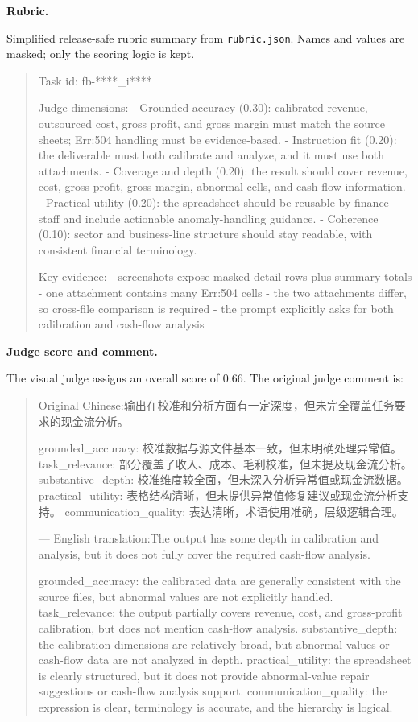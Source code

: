 \documentclass[11pt, a4paper, copyright, frontis]{frontis}
\newcommand{\inlinett}[1]{{\footnotesize\texttt{#1}}}
\newcommand{\caseheader}[1]{\noindent\colorbox{fbcaseblue}{\parbox{0.96\linewidth}{\color{white}\bfseries #1}}\vspace{0.5mm}\newline}
\newenvironment{casebox}{%
  \begin{quote}%
  \setlength{\parindent}{0pt}%
  \setlength{\parskip}{0pt}%
}{%
  \end{quote}%
}
\newenvironment{caselines}{%
  \begingroup
  \parindent0pt
  \parskip0pt
  \obeylines
  \obeyspaces
}{%
  \endgroup
}
\begin{document}
\caseheader{Rubric.}
Simplified release-safe rubric summary from \inlinett{rubric.json}. Names and values are masked; only the scoring logic is kept.
\begin{casebox}\scriptsize\raggedright
\begin{caselines}
Task id: fb-****\_i****

Judge dimensions:
- Grounded accuracy (0.30): calibrated revenue, outsourced cost, gross profit, and gross margin must match the source sheets; Err:504 handling must be evidence-based.
- Instruction fit (0.20): the deliverable must both calibrate and analyze, and it must use both attachments.
- Coverage and depth (0.20): the result should cover revenue, cost, gross profit, gross margin, abnormal cells, and cash-flow information.
- Practical utility (0.20): the spreadsheet should be reusable by finance staff and include actionable anomaly-handling guidance.
- Coherence (0.10): sector and business-line structure should stay readable, with consistent financial terminology.

Key evidence:
- screenshots expose masked detail rows plus summary totals
- one attachment contains many Err:504 cells
- the two attachments differ, so cross-file comparison is required
- the prompt explicitly asks for both calibration and cash-flow analysis
\end{caselines}
\end{casebox}


\caseheader{Judge score and comment.}
The visual judge assigns an overall score of 0.66. The original judge comment is:

\begin{casebox}\scriptsize\raggedright
\begin{caselines}
Original Chinese:\nopagebreak[4]
输出在校准和分析方面有一定深度，但未完全覆盖任务要求的现金流分析。

grounded\_accuracy: 校准数据与源文件基本一致，但未明确处理异常值。
task\_relevance: 部分覆盖了收入、成本、毛利校准，但未提及现金流分析。
substantive\_depth: 校准维度较全面，但未深入分析异常值或现金流数据。
practical\_utility: 表格结构清晰，但未提供异常值修复建议或现金流分析支持。
communication\_quality: 表达清晰，术语使用准确，层级逻辑合理。

---
English translation:\nopagebreak[4]
The output has some depth in calibration and analysis, but it does not fully cover the required cash-flow analysis.

grounded\_accuracy: the calibrated data are generally consistent with the source files, but abnormal values are not explicitly handled.
task\_relevance: the output partially covers revenue, cost, and gross-profit calibration, but does not mention cash-flow analysis.
substantive\_depth: the calibration dimensions are relatively broad, but abnormal values or cash-flow data are not analyzed in depth.
practical\_utility: the spreadsheet is clearly structured, but it does not provide abnormal-value repair suggestions or cash-flow analysis support.
communication\_quality: the expression is clear, terminology is accurate, and the hierarchy is logical.
\end{caselines}
\end{casebox}
\end{document}
